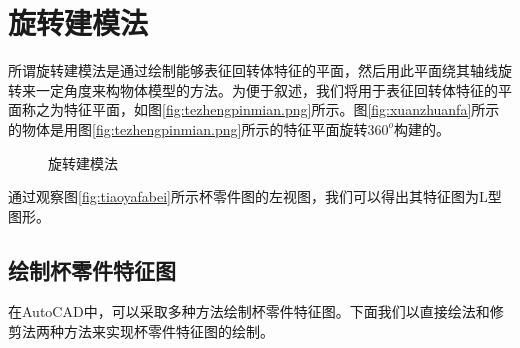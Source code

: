 \section{旋转建模法}
所谓旋转建模法是通过绘制能够表征回转体特征的平面，然后用此平面绕其轴线旋转来一定角度来构物体模型的方法。为便于叙述，我们将用于表征回转体特征的平面称之为特征平面，如图\ref{fig:tezhengpinmian.png}所示。图\ref{fig:xuanzhuanfa}所示的物体是用图\ref{fig:tezhengpinmian.png}所示的特征平面旋转$360^o$构建的。
\begin{figure}[htbp]
\hspace{20pt}
\caption{旋转建模法}
\end{figure}
通过观察图\ref{fig:tiaoyafabei}所示杯零件图的左视图，我们可以得出其特征图为L型图形。
\subsection{绘制杯零件特征图}\label{sec:beilingjiantezheng}
在AutoCAD中，可以采取多种方法绘制杯零件特征图。下面我们以直接绘法和修剪法两种方法来实现杯零件特征图的绘制。
